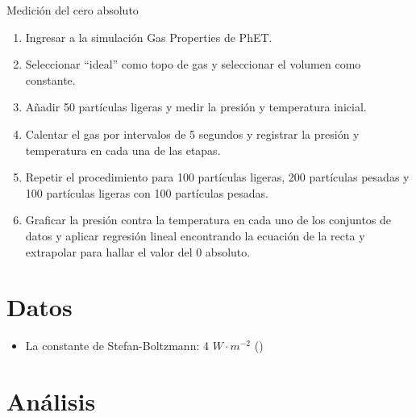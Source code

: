 \documentclass[12pt,a4paper]{config/myConfig}
\begin{document}
\begin{metodologiaLab}{Medición del cero absoluto}
{\begin{enumerate}
    \item Ingresar a la simulación Gas Properties de PhET.
    \item Seleccionar “ideal” como topo de gas y seleccionar el volumen como constante.
    \item Añadir 50 partículas ligeras y medir la presión y temperatura inicial. 
    \item Calentar el gas por intervalos de 5 segundos y registrar la presión y temperatura en cada una de las etapas.
    \item Repetir el procedimiento para 100 partículas ligeras, 200 partículas pesadas y 100 partículas ligeras con 100 partículas pesadas.
    \item Graficar la presión contra la temperatura en cada uno de los conjuntos de datos y aplicar regresión lineal encontrando la ecuación de la recta y extrapolar para hallar el valor del 0 absoluto.  
\end{enumerate}}
\end{metodologiaLab}







\section{Datos}
\label{sec:DATOS}


\begin{itemize}[label=$\rightarrow$, left=0pt]
  \item La constante de Stefan-Boltzmann: 4 $W\cdot m^{-2}$ \hfill(\cite{physicsTextbook})
  \end{itemize}


\section{Análisis}
\label{sec:ANALISIS}
\end{document}
